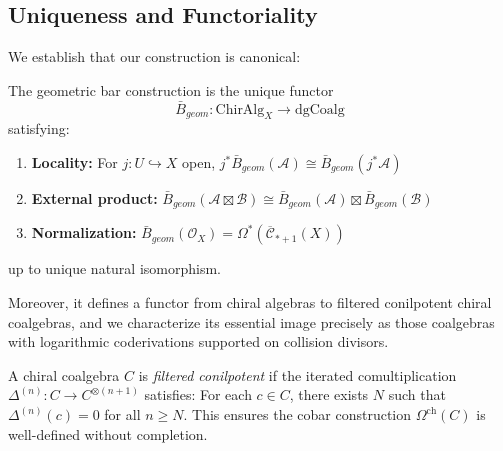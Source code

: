 \subsection{Uniqueness and Functoriality}
 
We establish that our construction is canonical:

\begin{theorem}\label{thm:bar-uniqueness-functoriality}
The geometric bar construction is the unique functor 
$$\bar{B}_{geom}: \text{ChirAlg}_X \to \text{dgCoalg}$$
satisfying:
\begin{enumerate}
\item \textbf{Locality:} For $j: U \hookrightarrow X$ open, $j^*\bar{B}_{geom}(\mathcal{A}) \cong \bar{B}_{geom}(j^*\mathcal{A})$
\item \textbf{External product:} $\bar{B}_{geom}(\mathcal{A} \boxtimes \mathcal{B}) \cong \bar{B}_{geom}(\mathcal{A}) \boxtimes \bar{B}_{geom}(\mathcal{B})$
\item \textbf{Normalization:} $\bar{B}_{geom}(\mathcal{O}_X) = \Omega^*(\overline{\mathcal{C}}_{*+1}(X))$
\end{enumerate}
up to unique natural isomorphism.

Moreover, it defines a functor from chiral algebras to filtered conilpotent chiral coalgebras, and we characterize its essential image precisely as those coalgebras with logarithmic coderivations supported on collision divisors.
\end{theorem}

 
\begin{definition}
A chiral coalgebra $C$ is \emph{filtered conilpotent} if the iterated comultiplication 
$\Delta^{(n)} : C \to C^{\otimes(n+1)}$ satisfies: For each $c \in C$, there exists 
$N$ such that $\Delta^{(n)}(c) = 0$ for all $n \geq N$. This ensures the cobar 
construction $\Omega^{\text{ch}}(C)$ is well-defined without completion.
\end{definition}



